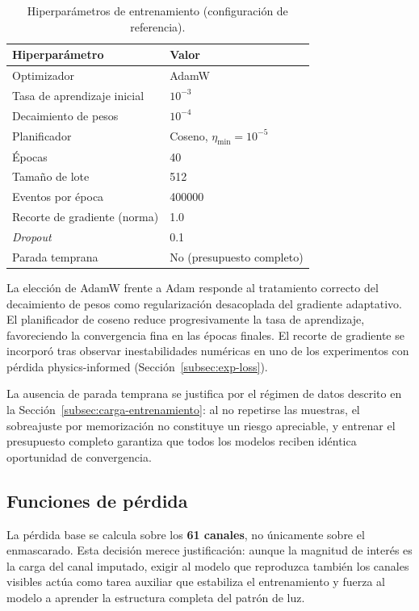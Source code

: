 \begin{table}[htbp]
\centering
\caption{Hiperparámetros de entrenamiento (configuración de referencia).}
\label{tab:hiperparametros}
\begin{tabular}{ll}
\toprule
\textbf{Hiperparámetro} & \textbf{Valor} \\
\midrule
Optimizador & AdamW \\
Tasa de aprendizaje inicial & $10^{-3}$ \\
Decaimiento de pesos & $10^{-4}$ \\
Planificador & Coseno, $\eta_{\min} = 10^{-5}$ \\
Épocas & 40 \\
Tamaño de lote & 512 \\
Eventos por época & \num{400000} \\
Recorte de gradiente (norma) & 1.0 \\
\emph{Dropout} & 0.1 \\
Parada temprana & No (presupuesto completo) \\
\bottomrule
\end{tabular}
\end{table}

La elección de AdamW frente a Adam responde al tratamiento correcto del decaimiento de pesos como
regularización desacoplada del gradiente adaptativo. El planificador de coseno reduce
progresivamente la tasa de aprendizaje, favoreciendo la convergencia fina en las épocas finales. El
recorte de gradiente se incorporó tras observar inestabilidades numéricas en uno de los experimentos
con pérdida physics-informed (Sección~\ref{subsec:exp-loss}).

La ausencia de parada temprana se justifica por el régimen de datos descrito en la
Sección~\ref{subsec:carga-entrenamiento}: al no repetirse las muestras, el sobreajuste por
memorización no constituye un riesgo apreciable, y entrenar el presupuesto completo garantiza que
todos los modelos reciben idéntica oportunidad de convergencia.

\subsection{Funciones de pérdida}
\label{subsec:funciones-perdida}

La pérdida base se calcula sobre los \textbf{61 canales}, no únicamente sobre el enmascarado. Esta
decisión merece justificación: aunque la magnitud de interés es la carga del canal imputado, exigir
al modelo que reproduzca también los canales visibles actúa como tarea auxiliar que estabiliza el
entrenamiento y fuerza al modelo a aprender la estructura completa del patrón de luz.

